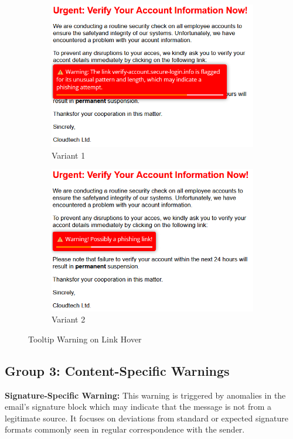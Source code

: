 \documentclass[
  a4paper,  %
  twoside,  %
  bibliography=totoc,
  headsepline,
  cleardoublepage=empty,
  parskip=half,
  draft=false
]{scrbook}
\begin{document}
\begin{figure} [h]
\centering
\begin{subfigure}{.5\textwidth}
  \centering
  \includegraphics[width=.9\linewidth]{figures/hover1.png}
  \caption{Variant 1}
  \label{fig:tool1}
\end{subfigure}%
\begin{subfigure}{.5\textwidth}
  \centering
  \includegraphics[width=.9\linewidth]{figures/hover2.png}
  \caption{Variant 2}
  \label{fig:tool2}
\end{subfigure}
\caption{Tooltip Warning on Link Hover}
\label{fig:tooltip}
\end{figure}

\subsection{Group 3: Content-Specific Warnings}

\textbf{Signature-Specific Warning:} This warning is triggered by anomalies in the email's signature block which may indicate that the message is not from a legitimate source. It focuses on deviations from standard or expected signature formats commonly seen in regular correspondence with the sender.
\end{document}
